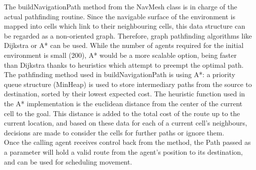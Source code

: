The buildNavigationPath method from the NavMesh class is in charge of the actual pathfinding routine. Since the navigable surface of the environment is mapped into cells which link to their neighbouring cells, this data structure can be regarded as a non-oriented graph. Therefore, graph pathfinding algorithms like Dijkstra\cite{Dijkstra} or A*\cite{Astar} can be used.  While the number of agents required for the initial environment is small (200), A* would be a more scalable option, being faster than Dijkstra thanks to heuristics which attempt to preempt the optimal path.\\
The pathfinding method used in buildNavigationPath is using A*: a priority queue structure (MinHeap) is used to store intermediary paths from the source to destination, sorted by their lowest expected cost. The heuristic function used in the A* implementation is the euclidean distance from the center of the current cell to the goal. This distance is added to the total cost of the route up to the current location, and based on these data for each of a current cell's neighbours, decisions are made to consider the cells for further paths or ignore them.\\
Once the calling agent receives control back from the method, the Path passed as a parameter will hold a valid route from the agent's position to its destination, and can be used for scheduling movement.

%
%
%
